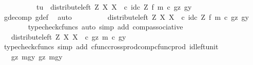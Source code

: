 \begin{isabellebody}
\ \ \isamarkupfalse%
\ {\isacharminus}{\kern0pt}\isanewline
\ \ \ \ \isamarkupfalse%
\ {\isachardoublequoteopen}{\isasymlangle}t{\isacharcomma}{\kern0pt}u{\isasymrangle}\ {\isacharequal}{\kern0pt}\ {\isacharparenleft}{\kern0pt}distribute{\isacharunderscore}{\kern0pt}left\ Z\ X\ X\ \ {\isasymcirc}\isactrlsub c\ id\isactrlsub c\ Z\ {\isasymtimes}\isactrlsub f\ m{\isacharparenright}{\kern0pt}\ {\isasymcirc}\isactrlsub c\ {\isasymlangle}gz{\isacharcomma}{\kern0pt}\ gy{\isasymrangle}{\isachardoublequoteclose}\isanewline
\ \ \ \ \ \ \isamarkupfalse%
\ g{\isacharunderscore}{\kern0pt}decomp\ g{\isacharunderscore}{\kern0pt}def\ \isamarkupfalse%
\ auto\isanewline
\ \ \ \ \isamarkupfalse%
\ \isamarkupfalse%
\ {\isachardoublequoteopen}{\isachardot}{\kern0pt}{\isachardot}{\kern0pt}{\isachardot}{\kern0pt}\ {\isacharequal}{\kern0pt}\ distribute{\isacharunderscore}{\kern0pt}left\ Z\ X\ X\ \ {\isasymcirc}\isactrlsub c\ {\isacharparenleft}{\kern0pt}id\isactrlsub c\ Z\ {\isasymtimes}\isactrlsub f\ m{\isacharparenright}{\kern0pt}\ {\isasymcirc}\isactrlsub c\ {\isasymlangle}gz{\isacharcomma}{\kern0pt}\ gy{\isasymrangle}{\isachardoublequoteclose}\isanewline
\ \ \ \ \ \ \isamarkupfalse%
\ {\isacharparenleft}{\kern0pt}typecheck{\isacharunderscore}{\kern0pt}cfuncs{\isacharcomma}{\kern0pt}\ auto\ simp\ add{\isacharcolon}{\kern0pt}\ comp{\isacharunderscore}{\kern0pt}associative{}{\isacharparenright}{\kern0pt}\isanewline
\ \ \ \ \isamarkupfalse%
\ \isamarkupfalse%
\ {\isachardoublequoteopen}{\isachardot}{\kern0pt}{\isachardot}{\kern0pt}{\isachardot}{\kern0pt}\ {\isacharequal}{\kern0pt}\ distribute{\isacharunderscore}{\kern0pt}left\ Z\ X\ X\ \ {\isasymcirc}\isactrlsub c\ {\isasymlangle}gz{\isacharcomma}{\kern0pt}\ m\ {\isasymcirc}\isactrlsub c\ gy{\isasymrangle}{\isachardoublequoteclose}\isanewline
\ \ \ \ \ \ \isamarkupfalse%
\ {\isacharparenleft}{\kern0pt}typecheck{\isacharunderscore}{\kern0pt}cfuncs{\isacharcomma}{\kern0pt}\ simp\ add{\isacharcolon}{\kern0pt}\ cfunc{\isacharunderscore}{\kern0pt}cross{\isacharunderscore}{\kern0pt}prod{\isacharunderscore}{\kern0pt}comp{\isacharunderscore}{\kern0pt}cfunc{\isacharunderscore}{\kern0pt}prod\ id{\isacharunderscore}{\kern0pt}left{\isacharunderscore}{\kern0pt}unit{}{\isacharparenright}{\kern0pt}\isanewline
\ \ \ \ \isamarkupfalse%
\ \isamarkupfalse%
\ {\isachardoublequoteopen}{\isachardot}{\kern0pt}{\isachardot}{\kern0pt}{\isachardot}{\kern0pt}\ {\isacharequal}{\kern0pt}\ {\isasymlangle}{\isasymlangle}gz{\isacharcomma}{\kern0pt}\ mgy{}{\isasymrangle}{\isacharcomma}{\kern0pt}\ {\isasymlangle}gz{\isacharcomma}{\kern0pt}\ mgy{}{\isasymrangle}{\isasymrangle}{\isachardoublequoteclose}\isanewline

\end{isabellebody}
